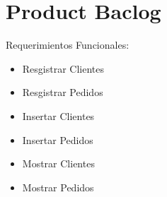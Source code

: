 \chapter{Product Baclog}

Requerimientos Funcionales:
\begin{itemize}
	\item Resgistrar Clientes
	\item Resgistrar Pedidos
	\item Insertar Clientes
	\item Insertar Pedidos
	\item Mostrar Clientes
	\item Mostrar Pedidos
\end{itemize}
